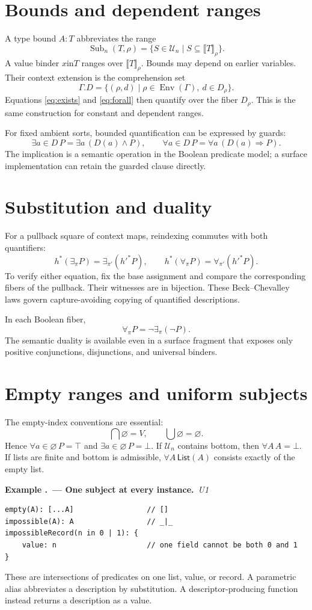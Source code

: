 \documentclass[11pt,a4paper,oneside]{report}
\newcommand{\sem}[1]{\llbracket #1\rrbracket}
\newcommand{\Env}{\operatorname{Env}}
\newcommand{\List}{\mathsf{List}}
\newcommand{\U}{\mathcal U}
\newcommand{\Uone}{\ensuremath{\profilecal{U}_{1}}}
\def\Uone{U1}%
\theoremstyle{remark}
\newcounter{example}[chapter]
\renewcommand{\theexample}{\thechapter.\arabic{example}}
\newcommand{\example}[2]{\refstepcounter{example}\Needspace{5\baselineskip}\par\textbf{Example \theexample\ --- #1.}\ \textit{#2}\par\nopagebreak[4]}
\begin{document}
\section{Bounds and dependent ranges}
A type bound $A:T$ abbreviates the range
\[
 \operatorname{Sub}_n(T,\rho)
 =\{S\in\U_n\mid S\subseteq\sem T_\rho\}.
\]
A value binder $x\mathbin{\mathrm{in}}T$ ranges over $\sem T_\rho$.
Bounds may depend on earlier variables. Their context extension is the
comprehension set
\[
 \Gamma.D=\{(\rho,d)\mid\rho\in\Env(\Gamma),\ d\in D_\rho\}.
\]
Equations \eqref{eq:exists} and \eqref{eq:forall} then quantify over the fiber
$D_\rho$. This is the same construction for constant and dependent ranges.

For fixed ambient sorts, bounded quantification can be expressed by guards:
\[
 \exists a\in D\,P=\exists a\,(D(a)\land P),\qquad
 \forall a\in D\,P=\forall a\,(D(a)\Rightarrow P).
\]
The implication is a semantic operation in the Boolean predicate model; a
surface implementation can retain the guarded clause directly.

\section{Substitution and duality}
For a pullback square of context maps, reindexing commutes with both
quantifiers:
\[
 h^*(\exists_\pi P)=\exists_{\pi'}(h'^*P),\qquad
 h^*(\forall_\pi P)=\forall_{\pi'}(h'^*P).
\]
To verify either equation, fix the base assignment and compare the corresponding
fibers of the pullback. Their witnesses are in bijection. These Beck--Chevalley
laws govern capture-avoiding copying of quantified descriptions.

In each Boolean fiber,
\[
 \forall_\pi P=\neg\exists_\pi(\neg P).
\]
The semantic duality is available even in a surface fragment that exposes only
positive conjunctions, disjunctions, and universal binders.

\section{Empty ranges and uniform subjects}
The empty-index conventions are essential:
\[
 \bigcap\varnothing=V,\qquad\bigcup\varnothing=\varnothing.
\]
Hence $\forall a\in\varnothing\,P=\top$ and
$\exists a\in\varnothing\,P=\bot$. If $\U_n$ contains bottom, then
$\forall A\,A=\bot$. If lists are finite and bottom is admissible,
$\forall A\,\List(A)$ consists exactly of the empty list.

\example{One subject at every instance}{\Uone{}}
\par\noindent\begin{minipage}{\linewidth}
\begin{lstlisting}
empty(A): [...A]                 // []
impossible(A): A                 // _|_
impossibleRecord(n in 0 | 1): {
    value: n                     // one field cannot be both 0 and 1
}
\end{lstlisting}
\end{minipage}\par
These are intersections of predicates on one list, value, or record.
A parametric alias abbreviates a description by substitution. A
descriptor-producing function instead returns a description as a value.
\end{document}
